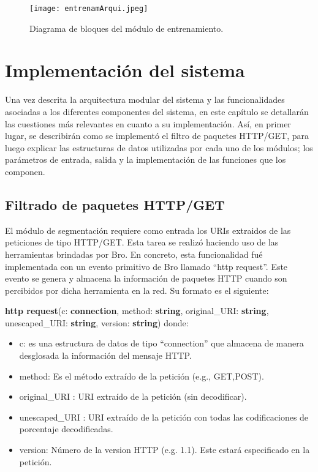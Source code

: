 \begin{figure}[tb]
\begin{center}
\texttt{[image: entrenamArqui.jpeg]}
\caption{Diagrama de bloques del módulo de entrenamiento.}
\label{fig:arquiEntrenamiento}
\end{center}
\end{figure}

\section{Implementación del sistema}

Una vez descrita la arquitectura modular del sistema y las funcionalidades asociadas a los diferentes componentes del sistema, en este capítulo se detallarán las cuestiones más relevantes en cuanto a su implementación.
Así, en primer lugar, se describirán como se implementó el filtro de paquetes HTTP/GET, para luego explicar las estructuras de datos utilizadas por cada uno de los módulos; los parámetros de entrada, salida y la implementación de las funciones que los componen.

\subsection{Filtrado de paquetes HTTP/GET}

El módulo de segmentación requiere como entrada los URIs extraidos de las peticiones de tipo HTTP/GET. Esta tarea se realizó haciendo uso de las herramientas brindadas por Bro. En concreto, esta funcionalidad fué implementada con un evento primitivo de Bro llamado ``http request''. Este evento se genera y almacena la información de paquetes HTTP cuando son percibidos por dicha herramienta en la red. Su formato es el siguiente:

\textbf{http request}(c: \textbf{connection}, method: \textbf{string}, original\_URI: \textbf{string},
unescaped\_URI: \textbf{string}, version: \textbf{string})
donde:
\begin{itemize}
\item c: es una estructura de datos de tipo ``connection'' que almacena de manera desglosada la información del mensaje HTTP.
\item method: Es el método extraído de la petición (e.g., GET,POST).
\item original\_URI : URI extraído de la petición (sin decodificar).
\item unescaped\_URI : URI extraído de la petición con todas las codificaciones de porcentaje decodificadas.
\item version: Número de la version HTTP (e.g. 1.1). Este estará especificado en la petición.
\end{itemize}

